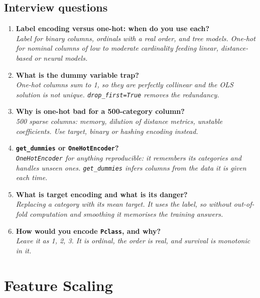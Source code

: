 \documentclass[11pt,a4paper]{article}
\begin{document}
\subsection*{Interview questions}

\begin{enumerate}\itemsep4pt
  \item \textbf{Label encoding versus one-hot: when do you use each?}\\
        \emph{Label for binary columns, ordinals with a real order, and tree models. One-hot
        for nominal columns of low to moderate cardinality feeding linear, distance-based or
        neural models.}
  \item \textbf{What is the dummy variable trap?}\\
        \emph{One-hot columns sum to 1, so they are perfectly collinear and the OLS solution
        is not unique. \lstinline|drop_first=True| removes the redundancy.}
  \item \textbf{Why is one-hot bad for a 500-category column?}\\
        \emph{500 sparse columns: memory, dilution of distance metrics, unstable
        coefficients. Use target, binary or hashing encoding instead.}
  \item \textbf{\lstinline|get_dummies| or \lstinline|OneHotEncoder|?}\\
        \emph{\lstinline|OneHotEncoder| for anything reproducible: it remembers its
        categories and handles unseen ones. \lstinline|get_dummies| infers columns from the
        data it is given each time.}
  \item \textbf{What is target encoding and what is its danger?}\\
        \emph{Replacing a category with its mean target. It uses the label, so without
        out-of-fold computation and smoothing it memorises the training answers.}
  \item \textbf{How would you encode \texttt{Pclass}, and why?}\\
        \emph{Leave it as 1, 2, 3. It is ordinal, the order is real, and survival is
        monotonic in it.}
\end{enumerate}

\newpage
\section{Feature Scaling}

\end{document}
